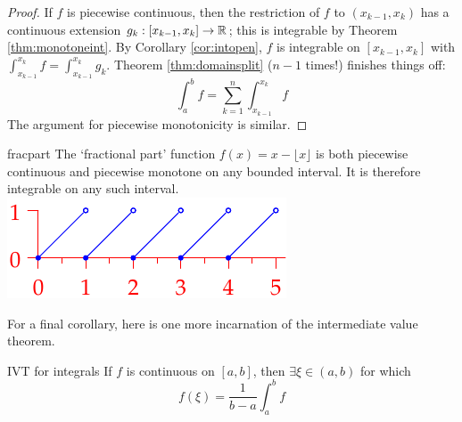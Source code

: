 \begin{proof}
	If $f$ is piecewise continuous, then the restriction of $f$ to $(x_{k-1},x_k)$ has a continuous extension $g_k:[x_{k-1},x_k]\to\mathbb{R}$; this is integrable by Theorem \ref{thm:monotoneint}. By Corollary \ref{cor:intopen}, $f$ is integrable on $[x_{k-1},x_k]$ with $\int_{x_{k-1}}^{x_k}f=\int_{x_{k-1}}^{x_k}g_k$. Theorem \ref{thm:domainsplit} ($n-1$ times!) finishes things off:
	\[
		\int_a^bf=\sum_{k=1}^n\int_{x_{k-1}}^{x_k}f
	\]
	The argument for piecewise monotonicity is similar.
\end{proof}


\begin{example}[lower separated=false, sidebyside, sidebyside align=top seam, sidebyside gap=0pt, righthand width=0.35\linewidth]{}{fracpart}
	The `fractional part' function $f(x)=x-\lfloor x\rfloor$ is both piecewise continuous and piecewise monotone on any bounded interval. It is therefore integrable on any such interval.
	\tcblower
	\flushright\includegraphics{fracpart}
\end{example}


For a final corollary, here is one more incarnation of the intermediate value theorem.

\begin{cor}{IVT for integrals}{}
	If $f$ is continuous on $[a,b]$, then $\exists \xi\in (a,b)$ for which
	\[
		f(\xi)=\frac 1{b-a}\int_a^bf
	\]
\end{cor}

